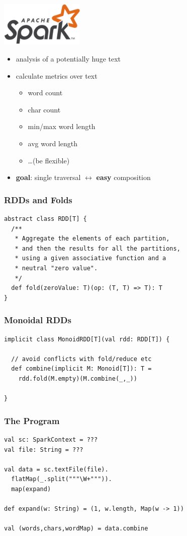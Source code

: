 \documentclass{beamer}
\begin{document}
\begin{frame}
  \begin{center}
    \includegraphics[width=0.3\textwidth]{../images/spark-logo-trademark.png}
  \end{center}

  \begin{itemize}
  \item analysis of a potentially huge text
  \item calculate metrics over text
    \begin{itemize}
    \item word count
    \item char count
    \item min/max word length
    \item avg word length
    \item \dots (be flexible)
    \end{itemize}
  \item \textbf{goal}: single traversal $\leftrightarrow$ \textbf{easy} composition
  \end{itemize}
\end{frame}

\begin{frame}[fragile]
  \frametitle{RDDs and Folds}
\begin{verbatim}
abstract class RDD[T] {
  /**
   * Aggregate the elements of each partition,
   * and then the results for all the partitions,
   * using a given associative function and a
   * neutral "zero value".
   */
  def fold(zeroValue: T)(op: (T, T) => T): T
}
\end{verbatim}
\end{frame}

\begin{frame}[fragile]
  \frametitle{Monoidal RDDs}
\begin{verbatim}
implicit class MonoidRDD[T](val rdd: RDD[T]) {

  // avoid conflicts with fold/reduce etc
  def combine(implicit M: Monoid[T]): T =
    rdd.fold(M.empty)(M.combine(_,_))

}
\end{verbatim}
\end{frame}

\begin{frame}
  \frametitle{The Program}
\begin{verbatim}
val sc: SparkContext = ???
val file: String = ???

val data = sc.textFile(file).
  flatMap(_.split("""\W+""")).
  map(expand)

def expand(w: String) = (1, w.length, Map(w -> 1))

val (words,chars,wordMap) = data.combine
\end{verbatim}
\end{frame}
\end{document}
